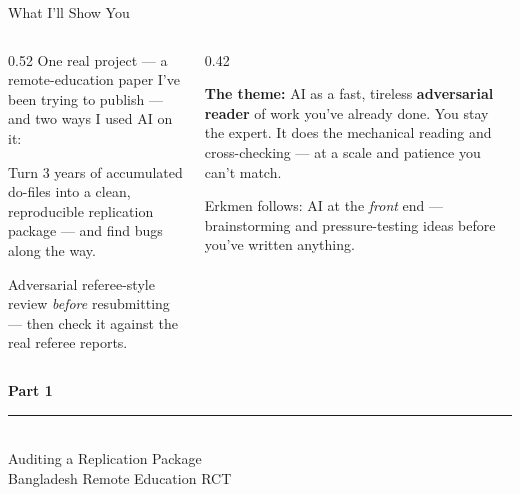 \documentclass[aspectratio=169, 10pt]{beamer}
\begin{document}
\begin{frame}{What I'll Show You}
\begin{columns}[T]
\begin{column}{0.52\textwidth}
\vskip4pt
One real project --- a remote-education paper I've been trying to publish --- and two ways I used AI on it:
\vskip6pt
\begin{tcolorbox}[keybox, title={\faCode\quad 1. Audit the code}]
\small Turn 3 years of accumulated do-files into a clean, reproducible replication package --- and find bugs along the way.
\end{tcolorbox}
\vskip4pt
\begin{tcolorbox}[keybox, title={\faSearch\quad 2. Audit the paper}]
\small Adversarial referee-style review \emph{before} resubmitting --- then check it against the real referee reports.
\end{tcolorbox}
\end{column}
\begin{column}{0.42\textwidth}
\begin{tcolorbox}[accentbox]
\small
\textbf{The theme:}
\vskip4pt
AI as a fast, tireless \textbf{adversarial reader} of work you've already done.
\vskip4pt
You stay the expert. It does the mechanical reading and cross-checking --- at a scale and patience you can't match.
\end{tcolorbox}
\vskip4pt
{\scriptsize\color{CoolGray} Erkmen follows: AI at the \textit{front} end --- brainstorming and pressure-testing ideas before you've written anything.}
\end{column}
\end{columns}
\end{frame}

{
\begin{frame}
\centering\vfill
{\fontsize{22}{28}\bfseries\selectfont\color{white} Part 1}\\[6pt]
{\color{UVMGold}\rule{5cm}{0.8pt}}\\[6pt]
{\normalsize\color{UVMGold} Auditing a Replication Package}\\[4pt]
{\small\color{PaleSage} Bangladesh Remote Education RCT}
\vfill
\end{frame}
}
\end{document}
